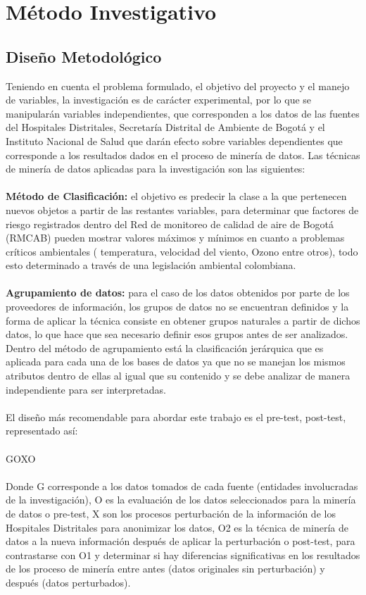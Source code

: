 \documentclass[a4paper,openright,12pt]{book}
\theoremstyle{definition}
\theoremstyle{remark}
\begin{document}
\section{Método Investigativo}
	\subsection{Diseño Metodológico}

Teniendo  en  cuenta el  problema formulado,  el objetivo del proyecto y  el manejo de variables, la  investigación es de carácter experimental, por lo que se manipularán variables independientes, que corresponden a los datos de las fuentes del Hospitales Distritales, Secretaría Distrital de Ambiente de Bogotá y el Instituto Nacional de Salud que darán efecto sobre variables dependientes que corresponde a los resultados dados en el proceso de minería de datos. Las técnicas de minería de datos aplicadas para la investigación son las siguientes:\\\\
\textbf{Método de Clasificación:} el objetivo es predecir la clase a la que pertenecen nuevos objetos a partir de las restantes variables, para determinar que factores de riesgo registrados dentro del Red de monitoreo de calidad de aire de Bogotá (RMCAB) pueden mostrar valores máximos y mínimos en cuanto a problemas críticos ambientales ( temperatura, velocidad del viento, Ozono entre otros), todo esto determinado a través de una legislación ambiental colombiana.\\\\
\textbf{Agrupamiento de datos:} para el caso de los datos obtenidos por parte de los proveedores de  información, los grupos de datos no se encuentran definidos y la forma de aplicar la técnica consiste en obtener grupos naturales a partir de dichos datos, lo que hace que sea necesario definir esos grupos antes de ser analizados. Dentro del método de agrupamiento está la clasificación jerárquica que es aplicada para cada una de los bases de datos ya que no se manejan los mismos atributos dentro de ellas al igual que su contenido y se debe analizar de manera independiente para ser interpretadas.\\\\
El diseño  más  recomendable para abordar este trabajo es el  pre-test, post-test, representado así:\\\\
GOXO\\\\
Donde G corresponde a los datos tomados de cada fuente (entidades involucradas de la investigación), O es la evaluación de los datos seleccionados para la minería de datos o pre-test, X son los procesos perturbación de la información de los Hospitales Distritales para anonimizar los datos, O2 es la técnica de minería de datos a la nueva información después de aplicar la perturbación o post-test, para  contrastarse con O1 y determinar si hay  diferencias significativas en los resultados de los proceso de minería entre antes (datos originales sin perturbación) y después (datos perturbados).
\end{document}

